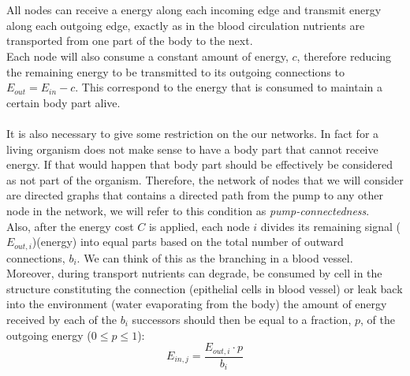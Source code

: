 \documentclass{amsart}
\theoremstyle{plain}
\numberwithin{equation}{section}
\begin{document}
\\
\\
All nodes can receive a energy along each incoming edge and transmit energy along each outgoing edge, exactly as in the blood circulation nutrients are transported from one part of the body to the next. \\
Each node will also consume a constant amount of energy, $c$, therefore reducing the remaining energy to be transmitted to its outgoing connections to $E_{out}=E_{in}-c$. This correspond to the energy that is consumed to maintain a certain body part alive.
\\
\\It is also necessary to give some restriction on the our networks. In fact for a living organism does not make sense to have a body part that cannot receive energy. If that would happen that body part should be effectively be considered as not part of the organism. Therefore, the network of nodes that we will consider are directed graphs that contains a directed path from the pump to any other node in the network, we will refer to this condition as \textit{pump-connectedness}. 
\\
Also, after the energy cost $C$ is applied, each node $i$ divides its remaining signal ($E_{out,i}$)(energy) into equal parts based on the total number of outward connections, $b_i$. We can think of this as the branching in a blood vessel. Moreover, during transport nutrients can degrade, be consumed by cell in the structure constituting the connection (epithelial cells in blood vessel) or leak back into the environment (water evaporating from the body) the amount of energy received by each of the $b_i$ successors should then be equal to a fraction, $p$, of the outgoing energy ($0\leq p\leq 1$): 
\begin{equation}
E_{in,j}=\frac{E_{out,i}\cdot p}{b_i}
\end{equation} 
\end{document}
